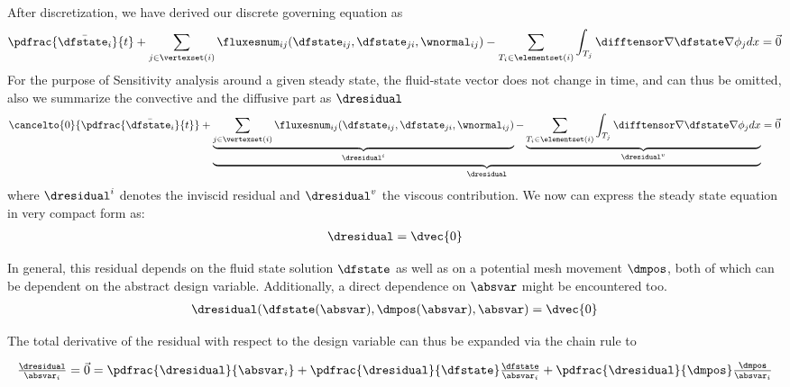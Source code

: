 \documentclass[../main.tex]{subfiles}
\begin{document}
After discretization, we have derived our discrete governing equation as 
\begin{align}\label{eq:nse_final_discretized_2}
\pdfrac{\bar{\dfstate_i}}{t} +
\sum_{j \in \vertexset(i)} \fluxesnum_{ij}(\dfstate_{ij},\dfstate_{ji},\wnormal_{ij}) -
\sum_{T_i \in \elementset(i)} \int_{T_j} \difftensor \nabla \dfstate \nabla \phi_j dx =
\vec{0}
\end{align}
For the purpose of Sensitivity analysis around a given steady state, the fluid-state vector does not change in time, and can thus be omitted, also we summarize the convective and the diffusive part as $\dresidual$ 
\begin{align}\label{eq:nse_final_discretized_notationchange}
\cancelto{0}{\pdfrac{\bar{\dfstate_i}}{t}} +
\underbrace{
  \underbrace{\sum_{j \in \vertexset(i)} \fluxesnum_{ij}(\dfstate_{ij},\dfstate_{ji},\wnormal_{ij})}_{\dresidual^i} -
  \underbrace{\sum_{T_i \in \elementset(i)} \int_{T_j} \difftensor \nabla \dfstate \nabla \phi_j dx}_{\dresidual^v}      }_{\dresidual} =
\vec{0}
\end{align}
where $\dresidual^i$ denotes the inviscid residual and $\dresidual^v$ the viscous contribution.
We now can express the steady state equation in very compact form as:
\begin{align}\label{eq:discrete_steady_state}
\dresidual=\dvec{0}
\end{align}


In general, this residual depends on the fluid state solution $\dfstate$ as well as on a potential mesh movement $\dmpos$, both of which can be dependent on the abstract design variable. Additionally, a direct dependence on $\absvar$ might be encountered too.
\begin{align}
\dresidual(\dfstate(\absvar),\dmpos(\absvar),\absvar)=\dvec{0}
\end{align}

The total derivative of the residual with respect to the design variable can thus be expanded via the chain rule to

\def\DdresidualBYabsvarI{ \tfrac{\dresidual}{\absvar_i} }
\def\PdresidualBYabsvarI{ \pdfrac{\dresidual}{\absvar_i} }
\def\PdresidualBYdfstate{ \pdfrac{\dresidual}{\dfstate}  }
\def\DdfstateBYabsvarI  { \tfrac{\dfstate}{\absvar_i}   }
\def\PdresidualBYdmms   { \pdfrac{\dresidual}{\dmpos}     }
\def\DdmmsBYabsvarI     { \tfrac{\dmpos}{\absvar_i}      }
\begin{align}
\DdresidualBYabsvarI=\vec{0}=
\PdresidualBYabsvarI                      +
\PdresidualBYdfstate    \DdfstateBYabsvarI +
\PdresidualBYdmms       \DdmmsBYabsvarI
\end{align}
\end{document}
